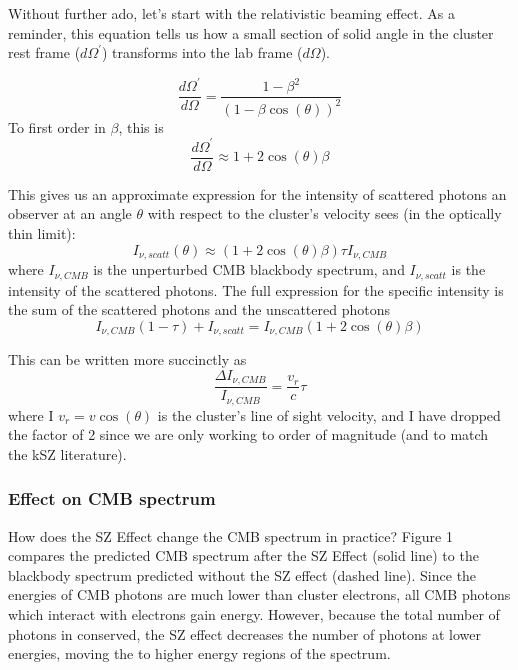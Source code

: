 \documentclass{article}
\begin{document}
Without further ado, let's start with the relativistic beaming effect.  As a reminder, this equation tells us how a small section of solid angle in the cluster rest frame ($d\Omega^\prime$) transforms into the lab frame ($d\Omega$).

\begin{equation}
  \frac{d\Omega^\prime}{d\Omega} = \frac{1 - \beta^2}{\left(1 - \beta \cos\left(\theta\right)\right)^2}
\end{equation}
To first order in $\beta$, this is
\begin{equation}
  \frac{d\Omega^\prime}{d\Omega} \approx 1 + 2 \cos\left(\theta\right) \beta
\end{equation}

This gives us an approximate expression for the intensity of scattered photons an observer at an angle $\theta$ with respect to the cluster's velocity sees (in the optically thin limit):
\begin{equation}
  I_{\nu,scatt}\left(\theta\right) \approx \left(1 + 2 \cos\left(\theta\right) \beta\right) \tau I_{\nu,CMB}
\end{equation}
where $I_{\nu,CMB}$ is the unperturbed CMB blackbody spectrum, and $I_{\nu,scatt}$ is the intensity of the scattered photons.  The full expression for the specific intensity is the sum of the scattered photons and the unscattered photons
\begin{equation}
  I_{\nu,CMB} \left(1 - \tau\right) + I_{\nu,scatt} = I_{\nu,CMB}\left(1 + 2 \cos\left(\theta\right) \beta\right)
\end{equation}

This can be written more succinctly as 
\begin{equation}
  \frac{\Delta I_{\nu,CMB}}{I_{\nu,CMB}} = \frac{v_r}{c} \tau
\end{equation}
where I $v_r = v \cos(\theta)$ is the cluster's line of sight velocity, and I have dropped the factor of 2 since we are only working to order of magnitude (and to match the kSZ literature).


\subsubsection{Effect on CMB spectrum
}

How does the SZ Effect change the CMB spectrum in practice? Figure 1 compares the predicted CMB spectrum after the SZ Effect (solid line) to the blackbody spectrum predicted without the SZ effect (dashed line). Since the energies of CMB photons are much lower than cluster electrons, all CMB photons which interact with electrons gain energy. However, because the total number of photons in conserved, the SZ effect decreases the number of photons at lower energies, moving the to higher energy regions of the spectrum. 
\end{document}
